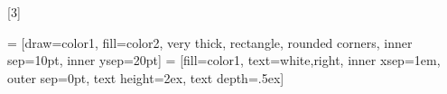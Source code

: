 
\let\oldvec\vec
\renewcommand{\vec}[1]{\bm{#1}} %
\newcommand{\vecf}[1]{\bm{#1}} %
\newcommand{\vecelem}[1]{#1}
\newcommand{\vecarrow}[1]{\vv{#1}}
\newcommand{\mat}[1]{\bm{#1}}
\newcommand{\matelem}[1]{\mathit{#1}}
\newcommand{\ten}[1]{\mathbf{#1}}
\newcommand{\tenelem}[1]{\mathrm{#1}}
\newcommand{\set}[1]{\mathbb{#1}}
\newcommand{\fspace}[1]{\mathcal{#1}}

\newcommand{\trans}[1]{#1^{\mathsf{T}}}
\newcommand{\ifrac}[2]{\sfrac{#1}{#2}}
\newcommand{\deriv}[2]{\frac{\text{d}#1}{\text{d}#2}}
\newcommand{\partderiv}[2]{\frac{\partial #1}{\partial #2}}
\newcommand{\ideriv}[2]{\ifrac{\text{d}#1}{\text{d}#2}}
\newcommand{\ipartderiv}[2]{\ifrac{\partial #1}{\partial #2}}

\DeclarePairedDelimiter{\norm}{\lVert}{\rVert}


\newcommand{\param}{\lambda}


\newcommand{\keyword}[1]{\textbf{#1}}
\newcommand{\para}{\par\medskip}
\newcommand{\ds}{\displaystyle}

\newcommand{\keycode}[1]{\texttt{#1}}
\newcommand{\code}[1]{\texttt{#1}}


\let\oldcite\cite
\renewcommand{\cite}[1]{{\color{red}(\oldcite{#1})}\\}





[3]
{

   = [draw=color1, fill=color2, very thick, rectangle, rounded corners, inner sep=10pt, inner ysep=20pt]
   = [fill=color1, text=white,right, inner xsep=1em, outer sep=0pt, text height=2ex, text depth=.5ex]
}


